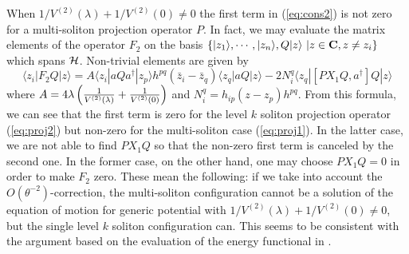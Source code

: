 \documentclass[a4paper,12pt]{article}
\begin{document}
When $1/V^{(2)}(\lambda)+1/V^{(2)}(0)\neq 0$
the first term
in (\ref{eq:cons2}) is not zero for a multi-soliton projection operator $P$.
In fact, we may evaluate the matrix elements of the operator $F_{2}$
on the basis
$\{ |z_{1}\rangle,\cdots,|z_{n}\rangle, Q|z\rangle
\ | z\in{\bf C}, z\neq z_{i} \}$ which spans ${\cal H}$.
Non-trivial elements are given by
\begin{equation}
\langle z_{i}|F_{2}Q|z\rangle=A
\langle z_{i}|a Q a^{\dagger}|z_{p}\rangle
h^{pq} (\bar{z}_{i}-\bar{z}_{q}) \langle z_{q}| aQ|z\rangle-2
N_{i}^{q} \langle z_{q}|[PX_{1}Q,a^{\dagger}]Q|z\rangle
\end{equation}
where
$A=4\lambda\left(
{1\over V^{(2)}(\lambda) }+{1\over V^{(2)}(0)}\right)$ and
$N_{i}^{q}=h_{ip}(z-z_{p})h^{pq}$.
{}From this formula, we can see that the first term is zero
for the level $k$ soliton projection operator (\ref{eq:proj2})
but non-zero for the multi-soliton case (\ref{eq:proj1}).
In the latter case, we are not able to find $PX_{1}Q$ so that
the non-zero first term is canceled by the second one.
In the former case, on the other hand,
one may choose $PX_{1}Q=0$ in order to make $F_{2}$ zero.
These mean the following:
if we take into account the $O(\theta^{-2})$-correction,
the multi-soliton configuration
cannot be a solution of the equation of
motion for generic potential with $1/V^{(2)}(\lambda)+1/V^{(2)}(0)\neq
0$, but the single level $k$ soliton configuration
can.
This seems to be consistent with the argument based on the
evaluation of the energy functional in \cite{GHS,HLRU,DJ}.
\end{document}
